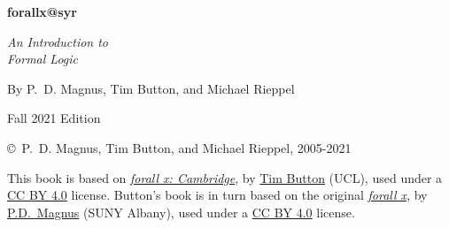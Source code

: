 \thispagestyle{empty}


    
\vspace{20pt}
    
\begin{center}
\fontsize{36pt}{36pt}\selectfont
  \textbf{forallx@syr}

\fontsize{24pt}{24pt}\selectfont
\vspace{1em}
\textit{An Introduction to\\ Formal Logic}


\vspace{40pt}

\fontsize{16pt}{18pt}\selectfont By P.~D. Magnus, Tim Button, and Michael Rieppel\\

\vspace{85pt}

\fontsize{20pt}{20pt}\selectfont
Fall 2021 Edition
\end{center}

\newpage


\noindent \small \copyright \ P.~D. Magnus, Tim Button, and Michael Rieppel, 2005-2021

\vspace{1ex}

\noindent This book is based on \href{http://www.homepages.ucl.ac.uk/~uctytbu/forallxcam.pdf}{\emph{forall x: Cambridge}}, by  \href{http://www.homepages.ucl.ac.uk/~uctytbu}{Tim Button}
(UCL), used under a \href{https://creativecommons.org/licenses/by/4.0/}{CC BY 4.0} license.  Button's book is in turn based on the original \href{https://www.fecundity.com/logic/}{\emph{forall x}}, by
\href{https://www.fecundity.com/job/}{P.D.\ Magnus} (SUNY Albany), used under a \href{https://creativecommons.org/licenses/by/4.0/}{CC BY 4.0} license.

